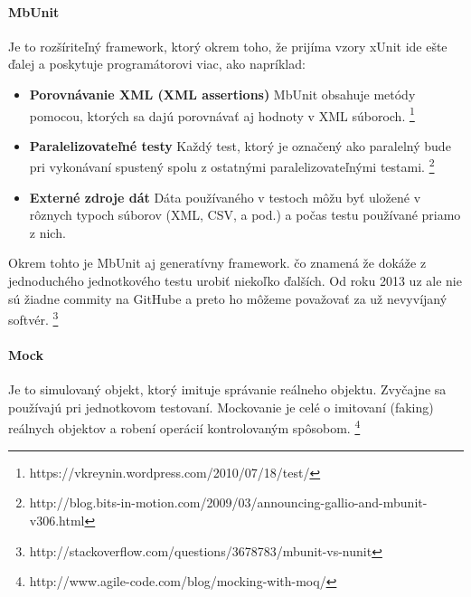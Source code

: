 \documentclass[11pt,twoside,slovak,a4paper]{article}
\begin{document}
			\paragraph{MbUnit} Je to rozšíriteľný framework, ktorý okrem toho, že prijíma vzory xUnit ide ešte ďalej a poskytuje programátorovi viac, ako napríklad:
			\begin{itemize}
				\item \textbf{Porovnávanie XML (XML assertions)} MbUnit obsahuje metódy pomocou, ktorých sa dajú porovnávať aj hodnoty v XML súboroch. \footnote{https://vkreynin.wordpress.com/2010/07/18/test/}
				\item \textbf{Paralelizovateľné testy} Každý test, ktorý je označený ako paralelný bude pri vykonávaní spustený spolu z ostatnými paralelizovateľnými testami. \footnote{http://blog.bits-in-motion.com/2009/03/announcing-gallio-and-mbunit-v306.html}
				\item \textbf{Externé zdroje dát} Dáta používaného v testoch môžu byť uložené v rôznych typoch súborov (XML, CSV, a pod.) a počas testu používané priamo z nich.
			\end{itemize}
			Okrem tohto je MbUnit aj generatívny framework. čo znamená že dokáže z jednoduchého jednotkového testu urobiť niekoľko ďalších. Od roku 2013 uz ale nie sú žiadne commity na GitHube a preto ho môžeme považovať za už nevyvíjaný softvér. \footnote{http://stackoverflow.com/questions/3678783/mbunit-vs-nunit}
			
			\paragraph{Mock} Je to simulovaný objekt, ktorý imituje správanie reálneho objektu. Zvyčajne sa používajú pri jednotkovom testovaní. Mockovanie je celé o imitovaní (faking) reálnych objektov a robení operácií kontrolovaným spôsobom. \footnote{http://www.agile-code.com/blog/mocking-with-moq/}
			
\end{document}
